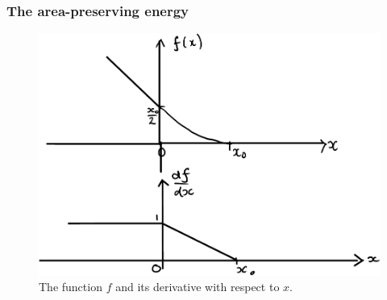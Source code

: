 \documentclass{article}
\newcommand{\EE}{\ensuremath{E_\mathrm{E}}\xspace}
\begin{document}

\subsubsection{The area-preserving energy}
\label{fold-sphere:sec:area-pres-energy}

\begin{figure}
  \centering
  \includegraphics[width=0.5\linewidth]{area-f-crop.pdf}
  \caption{The function $f$ and its derivative with respect to $x$.}
  \label{retistruct-algorithm:fig:area-f}
\end{figure}
\end{document}

